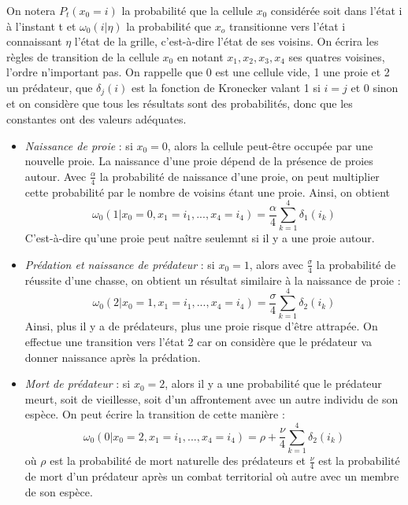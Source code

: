 On notera $ P_{t}(x_0=i)$ la probabilité que la cellule $x_0$ considérée soit dans l'état i à l'instant t et $\omega_0(i|\eta)$ la probabilité que $x_o$ transitionne vers l'état i connaissant $\eta$ l'état de la grille, c'est-à-dire l'état de ses voisins. On écrira les règles de transition de la cellule $x_0$ en notant $x_1, x_2, x_3, x_4$ ses quatres voisines, l'ordre n'important pas. On rappelle que 0 est une cellule vide, 1 une proie et 2 un prédateur, que $\delta_{j}(i)$ est la fonction de Kronecker valant 1 si $i=j$ et 0 sinon et on considère que tous les résultats sont des probabilités, donc que les constantes ont des valeurs adéquates.

\vspace{0.3cm}
\begin {itemize}
\item \textit{Naissance de proie} : si $x_0=0$, alors la cellule peut-être occupée par une nouvelle proie. La naissance d'une proie dépend de la présence de proies autour. Avec $\frac{\alpha}{4}$ la probabilité de naissance d'une proie, on peut multiplier cette probabilité par le nombre de voisins étant une proie. Ainsi, on obtient \begin{equation}\omega_0(1|x_0=0, x_1=i_1, ..., x_4=i_4)=\frac{\alpha}{4}\sum_{k=1}^{4}\delta_{1}(i_k)\end{equation} C'est-à-dire qu'une proie peut naître seulemnt si il y a une proie autour.

\vspace{0.3cm}
\item \textit{Prédation et naissance de prédateur} : si $x_0=1$, alors avec $\frac{\sigma}{4}$ la probabilité de réussite d'une chasse, on obtient un résultat similaire à la naissance de proie :\begin{equation} \omega_0(2|x_0=1, x_1=i_1, ..., x_4=i_4)=\frac{\sigma}{4}\sum_{k=1}^{4}\delta_{2}(i_k)\end{equation} Ainsi, plus il y a de prédateurs, plus une proie risque d'être attrapée. On effectue une transition vers l'état 2 car on considère que le prédateur va donner naissance après la prédation.

\vspace{0.3cm}
\item \textit{Mort de prédateur} : si $x_0=2$, alors il y a une probabilité que le prédateur meurt, soit de vieillesse, soit d'un affrontement avec un autre individu de son espèce. On peut écrire la transition de cette manière : \begin{equation}\omega_0(0|x_0=2, x_1=i_1, ..., x_4=i_4)=\rho + \frac{\nu}{4}\sum_{k=1}^{4}\delta_{2}(i_k)\end{equation} où $\rho$ est la probabilité de mort naturelle des prédateurs et $\frac{\nu}{4}$ est la probabilité de mort d'un prédateur après un combat territorial où autre avec un membre de son espèce. 


\end{itemize}
